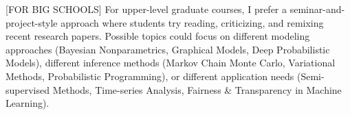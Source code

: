 \documentclass[11pt,letterpaper]{article}
\begin{document}
[FOR BIG SCHOOLS] For upper-level graduate courses, I prefer a seminar-and-project-style approach where students try reading, criticizing, and remixing recent research papers. Possible topics could focus on different modeling approaches (Bayesian Nonparametrics, Graphical Models, Deep Probabilistic Models), different inference methods (Markov Chain Monte Carlo, Variational Methods, Probabilistic Programming), or different application needs (Semi-supervised Methods, Time-series Analysis, Fairness \& Transparency in Machine Learning).

\end{document}
